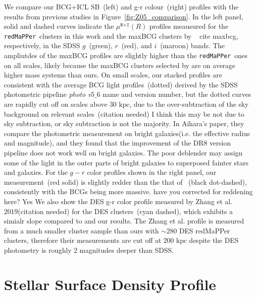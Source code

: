 \documentclass[fleqn,usenatbib]{mnras}
\newcommand{\mubi}{\mu^{\texttt{B+I}}}
\newcommand{\kpc}{\mathrm{kpc}}
\newcommand\ying[1]{{\color{red} {#1}}}
\newcommand\xkchen[1]{{\color{cyan} {#1}}}
\newcommand*\citeme{{\color{green}(citation needed)}}
\newcommand\redmapper{\texttt{redMaPPer}}
\begin{document}
We compare our BCG+ICL SB~(left) and g-r colour~(right) profiles with the
results from previous studies in Figure~\ref{fig:Z05_comparison}. In the
left panel, solid and dashed curves indicate the $\mubi(R)$ profiles
meausured for the \redmapper~clusters in this work and the maxBCG \xkchen{\citep{Annis1999, Bahcall2003} } clusters
by ~\ying{cite maxbcg}, respectively, in the SDSS $g$~(green),
$r$~(red), and $i$~(maroon) bands.  The ampliutdes of the maxBCG profiles
are slightly higher than the \redmapper~ones on all scales, likely because
the maxBCG clusters selected by  are on average higher mass systems than
ours. On small scales, our stacked profiles are consistent with the average
BCG light profiles~(dotted) derived by the SDSS photometric
pipeline \xkchen{\it{\rm{ photo v$5\_6$} } } \ying{name and version number}, but the dotted curves are rapidly
cut off on scales above 30 $\kpc$, due to the over-subtraction of the sky
background on relevant scales~\citeme \xkchen{\citep{Blanton2011, Aihara2011} } \xkchen{I think this may be not due to sky subtraction, or sky subtraction is not the majority. In Aihara's paper, they compare the photometric measurement on bright galaxies(i.e. the effective radius and magnitude), and they found that the improvement of the DR8 version pipeline does not work well on bright galaxies. The poor deblender may assign some of the light in the outer parts of bright galaxies to superposed fainter stars and galaxies}. For the $g{-}r$ color profiles shown
in the right panel, our measurement~(red solid) is slightly redder than the
that of ~(black dot-dashed), consistently with the  BCGs being more
massive.\ying{have you corrected for reddening here?} \xkchen{Yes} We also show the DES
g-r color profile measured by Zhang et al. 2019\citeme \xkchen{\citep{Zhang2019} }  for the DES
clusters~(cyan dashed), which exhibits a simialr slope compared to  and
our results. The Zhang et al. profile is measured from a much smaller
cluster sample than ours with \xkchen{$\sim280$} DES redMaPPer clusters, therefore their
measurements are cut off at \xkchen{200} $\kpc$ despite the DES photometry is
roughly \xkchen{2} magnitudes deeper than SDSS.


\section{Stellar Surface Density Profile}
\label{sec:sigma}
\end{document}
